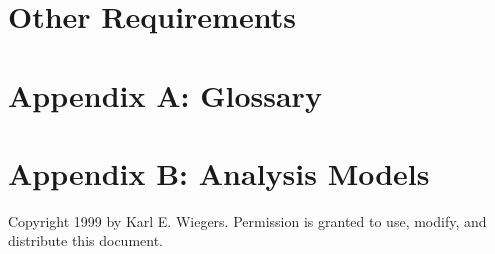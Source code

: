 \documentclass{scrreprt}
\begin{document}
\chapter{Other Requirements}
\chapter*{Appendix A: Glossary}
\chapter*{Appendix B: Analysis Models}

\begin{thebibliography}{1}
    
    
    Copyright  1999 by Karl E. Wiegers. Permission is granted to use, modify, and distribute this document.
\end{thebibliography}
\end{document}
